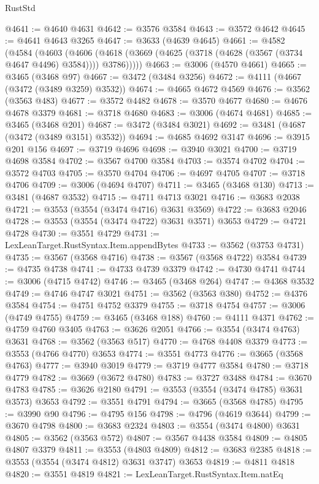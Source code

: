\begin{lexlean}{RustStd}
\begin{coremodule}
@4641 := @4640 @4631
@4642 := @3576 @3584
@4643 := @3572 @4642
@4645 := @4641 @4643 @3265
@4647 := @3633 (@4639 @4645)
@4661 := @4582
    (@4584
      (@4603
        (@4606 (@4618 (@3669 (@4625 (@3718 (@4628 (@3567 (@3734 @4647 @4496) @3584)))) @3786)))))
@4663 := @3006 (@4570 @4661)
@4665 := @3465 (@3468 @97)
@4667 := @3472 (@3484 @3256)
@4672 := @4111 (@4667 (@3472 (@3489 @3259) @3532))
@4674 := @4665 @4672 @4569
@4676 := @3562 (@3563 @483)
@4677 := @3572 @4482
@4678 := @3570 @4677
@4680 := @4676 @4678 @3379
@4681 := @3718 @4680
@4683 := @3006 (@4674 @4681)
@4685 := @3465 (@3468 @201)
@4687 := @3472 (@3484 @3021)
@4692 := @3481 (@4687 (@3472 (@3489 @3151) @3532))
@4694 := @4685 @4692 @3147
@4696 := @3915 @201 @156
@4697 := @3719 @4696
@4698 := @3940 @3021
@4700 := @3719 @4698 @3584
@4702 := @3567 @4700 @3584
@4703 := @3574 @4702
@4704 := @3572 @4703
@4705 := @3570 @4704
@4706 := @4697 @4705
@4707 := @3718 @4706
@4709 := @3006 (@4694 @4707)
@4711 := @3465 (@3468 @130)
@4713 := @3481 (@4687 @3532)
@4715 := @4711 @4713 @3021
@4716 := @3683 @2038
@4721 := @3553 (@3554 (@3474 @4716) @3631 @3569)
@4722 := @3683 @2046
@4728 := @3553 (@3554 (@3474 @4722) @3631 @3571) @3653
@4729 := @4721 @4728
@4730 := @3551 @4729
@4731 := LexLeanTarget.RustSyntax.Item.appendBytes
@4733 := @3562 (@3753 @4731)
@4735 := @3567 (@3568 @4716)
@4738 := @3567 (@3568 @4722) @3584
@4739 := @4735 @4738
@4741 := @4733 @4739 @3379
@4742 := @4730 @4741
@4744 := @3006 (@4715 @4742)
@4746 := @3465 (@3468 @264)
@4747 := @4368 @3532
@4749 := @4746 @4747 @3021
@4751 := @3562 (@3563 @380)
@4752 := @4376 @3584
@4754 := @4751 @4752 @3379
@4755 := @3718 @4754
@4757 := @3006 (@4749 @4755)
@4759 := @3465 (@3468 @188)
@4760 := @4111 @4371
@4762 := @4759 @4760 @3405
@4763 := @3626 @2051
@4766 := @3554 (@3474 @4763) @3631
@4768 := @3562 (@3563 @517)
@4770 := @4768 @4408 @3379
@4773 := @3553 (@4766 @4770) @3653
@4774 := @3551 @4773
@4776 := @3665 (@3568 @4763)
@4777 := @3940 @3019
@4779 := @3719 @4777 @3584
@4780 := @3718 @4779
@4782 := @3669 (@3672 @4780)
@4783 := @3727 @3488
@4784 := @3670 @4783
@4785 := @3626 @2180
@4791 := @3553 (@3554 (@3474 @4785) @3631 @3573) @3653
@4792 := @3551 @4791
@4794 := @3665 (@3568 @4785)
@4795 := @3990 @90
@4796 := @4795 @156
@4798 := @4796 (@4619 @3644)
@4799 := @3670 @4798
@4800 := @3683 @2324
@4803 := @3554 (@3474 @4800) @3631
@4805 := @3562 (@3563 @572)
@4807 := @3567 @4438 @3584
@4809 := @4805 @4807 @3379
@4811 := @3553 (@4803 @4809)
@4812 := @3683 @2385
@4818 := @3553 (@3554 (@3474 @4812) @3631 @3747) @3653
@4819 := @4811 @4818
@4820 := @3551 @4819
@4821 := LexLeanTarget.RustSyntax.Item.natEq

\end{coremodule}
\end{lexlean}
